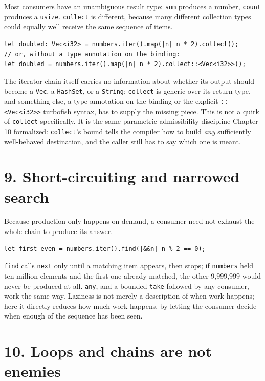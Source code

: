 \documentclass[11pt]{book}
\begin{document}
Most consumers have an unambiguous result type: \texttt{sum} produces a number, \texttt{count} produces a \texttt{usize}. \texttt{collect} is different, because many different collection types could equally well receive the same sequence of items.

\begin{lstlisting}
let doubled: Vec<i32> = numbers.iter().map(|n| n * 2).collect();
// or, without a type annotation on the binding:
let doubled = numbers.iter().map(|n| n * 2).collect::<Vec<i32>>();
\end{lstlisting}

The iterator chain itself carries no information about whether its output should become a \texttt{Vec}, a \texttt{HashSet}, or a \texttt{String}; \texttt{collect} is generic over its return type, and something else, a type annotation on the binding or the explicit \texttt{::<Vec<i32>>} turbofish syntax, has to supply the missing piece. This is not a quirk of \texttt{collect} specifically. It is the same parametric-admissibility discipline Chapter 10 formalized: \texttt{collect}'s bound tells the compiler how to build \emph{any} sufficiently well-behaved destination, and the caller still has to say which one is meant.

\section*{9. Short-circuiting and narrowed search}

Because production only happens on demand, a consumer need not exhaust the whole chain to produce its answer.

\begin{lstlisting}
let first_even = numbers.iter().find(|&&n| n % 2 == 0);
\end{lstlisting}

\texttt{find} calls \texttt{next} only until a matching item appears, then stops; if \texttt{numbers} held ten million elements and the first one already matched, the other 9,999,999 would never be produced at all. \texttt{any}, and a bounded \texttt{take} followed by any consumer, work the same way. Laziness is not merely a description of when work happens; here it directly reduces how much work happens, by letting the consumer decide when enough of the sequence has been seen.

\section*{10. Loops and chains are not enemies}
\end{document}
